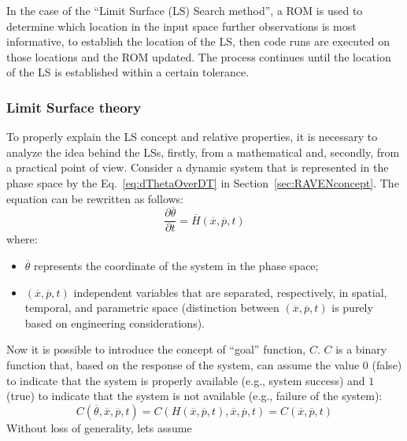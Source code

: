 In the case of the ``Limit 
Surface (LS) Search method'', a ROM is used to 
determine which location in the input space further observations is most 
informative, to establish the location of the LS, then code runs are 
executed on those locations and the ROM updated. The process 
continues until the location of the LS is established within a certain tolerance.

\subsubsection{Limit Surface theory}
\label{sec:LSconcept}	

To properly explain the LS concept and relative properties, 
it is necessary to analyze the idea behind the LSs, firstly, from a 
mathematical and, secondly, from a practical point of view.
Consider a dynamic system that is represented in the phase space by the Eq.~\ref{eq:dThetaOverDT} in Section~\ref{sec:RAVENconcept}. 
The equation can be rewritten as follows:
\begin{equation}
\label{eq:ThetaXPT}
\frac{\partial \overline{\theta} }{\partial t}=\overline{H}\left (  \overline{x},\overline{p},t \right )
\end{equation}
where:
\begin{itemize}
  \item $\overline{\theta}$ represents the coordinate of the system in the 
  phase space;
  \item $\left (  \overline{x},\overline{p},t \right )$ independent variables 
  that are separated, respectively, in spatial, temporal, and parametric  
  space (distinction between $\left (  \overline{x},\overline{p},t \right )$ is purely based on engineering considerations).
\end{itemize}
Now it is possible to introduce the concept of ``goal'' function, $C$. $C$ 
is a binary function that, based on the response of the system, can 
assume the value $0$ (false) to indicate that the system is properly 
available (e.g., system success) and $1$ (true) to indicate that the 
system is not available (e.g., failure of the system):
\begin{equation}
C\left (\overline{\theta}, \overline{x},\overline{p},t \right ) = C\left (H\left(\overline{x},\overline{p},t \right), \overline{x},\overline{p},t \right ) = C\left ( \overline{x},\overline{p},t \right ) 
\end{equation}
Without loss of generality, lets assume 
